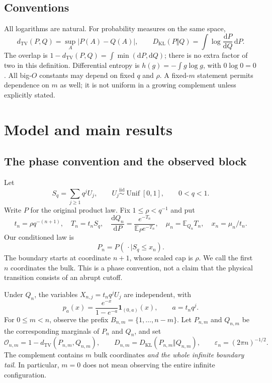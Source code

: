 \documentclass[11pt,a4paper]{article}
\numberwithin{equation}{section}
\theoremstyle{definition}
\theoremstyle{remark}
\newcommand{\E}{\mathbb E}
\newcommand{\TV}{d_{\mathrm{TV}}}
\newcommand{\KL}{D_{\mathrm{KL}}}
\newcommand{\ind}{\mathbf 1}
\newcommand{\eps}{\varepsilon}
\newcommand{\ov}{\mathcal O}
\newcommand{\dd}{\mathrm d}
\begin{document}
\subsection{Conventions}
All logarithms are natural. For probability measures on the same space,
\[
\TV(P,Q)=\sup_A|P(A)-Q(A)|,\qquad
\KL(P\Vert Q)=\int\log\frac{\dd P}{\dd Q}\,\dd P.
\]
The overlap is $1-\TV(P,Q)=\int\min(\dd P,\dd Q)$; there is no extra factor
of two in this definition. Differential entropy is
$h(g)=-\int g\log g$, with $0\log0=0$. All big-$O$ constants may depend on
fixed $q$ and $\rho$. A fixed-$m$ statement permits dependence on $m$ as
well; it is not uniform in a growing complement unless explicitly stated.

\section{Model and main results}
\label{sec:results}

\subsection{The phase convention and the observed block}
Let
\begin{equation}\label{eq:series}
S_q=\sum_{j\ge1}q^jU_j,\qquad
U_j\overset{\mathrm{iid}}\sim\operatorname{Unif}[0,1],\qquad 0<q<1.
\end{equation}
Write $P$ for the original product law. Fix $1\le\rho<q^{-1}$ and put
\begin{equation}\label{eq:tilt}
t_n=\rho q^{-(n+1)},\quad T_n=t_nS_q,\quad
\frac{\dd Q_n}{\dd P}=\frac{e^{-T_n}}{\E_P e^{-T_n}},\quad
\mu_n=\E_{Q_n}T_n,\quad x_n=\mu_n/t_n.
\end{equation}
Our conditioned law is
\begin{equation}\label{eq:condition}
P_n=P(\,\cdot\mid S_q\le x_n).
\end{equation}
The boundary starts at coordinate $n+1$, whose scaled cap is $\rho$.
We call the first $n$ coordinates the bulk. This is a phase convention,
not a claim that the physical transition consists of an abrupt cutoff.

Under $Q_n$, the variables $X_{n,j}=t_nq^jU_j$ are independent, with
\begin{equation}\label{eq:te}
p_a(x)=\frac{e^{-x}}{1-e^{-a}}\ind_{(0,a)}(x),\qquad
 a=t_nq^j.
\end{equation}
For $0\le m<n$, observe the prefix $B_{n,m}=\{1,\ldots,n-m\}$.
Let $P_{n,m}$ and $Q_{n,m}$ be the corresponding marginals of $P_n$ and
$Q_n$, and set
\[
\ov_{n,m}=1-\TV(P_{n,m},Q_{n,m}),\qquad
D_{n,m}=\KL(P_{n,m}\Vert Q_{n,m}),\qquad
\eps_n=(2\pi n)^{-1/2}.
\]
The complement contains $m$ bulk coordinates \emph{and the whole infinite
boundary tail}. In particular, $m=0$ does not mean observing the entire
infinite configuration.
\end{document}
